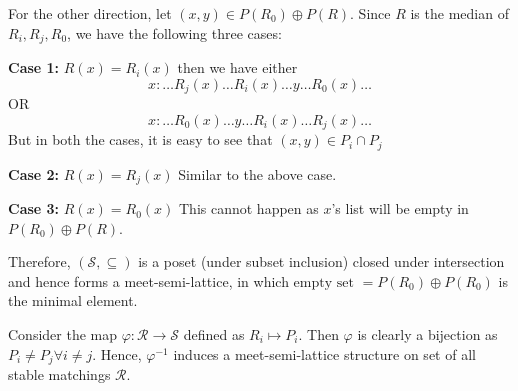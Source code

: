 \documentclass[12pt]{article}
\begin{document}
For the other direction, let $(x,y) \in P(R_0) \oplus P(R)$. Since $R$ is the median of $R_i, R_j, R_0$, we have the following three cases:

\textbf{Case 1:} $R(x) = R_i(x)$ then we have either 
$$x: \ldots R_j(x) \ldots R_i(x) \ldots y \ldots R_0(x) \ldots$$
OR
$$x: \ldots R_0(x) \ldots y \ldots R_i(x) \ldots R_j(x) \ldots$$
But in both the cases, it is easy to see that $(x,y) \in P_i \cap P_j$

\textbf{Case 2:} $R(x) = R_j(x)$ Similar to the above case.

\textbf{Case 3:} $R(x) = R_0(x)$ This cannot happen as $x$'s list will be empty in $P(R_0) \oplus P(R)$.
\newline

Therefore, $(\mathscr{S}, \subseteq)$ is a poset (under subset inclusion) closed under intersection and hence forms a meet-semi-lattice, in which $\text{empty set } = P(R_0) \oplus P(R_0)$ is the minimal element.

Consider the map $\varphi: \mathscr{R} \rightarrow \mathscr{S}$ defined as $R_i \mapsto P_i$. Then $\varphi$ is clearly a bijection as $P_i \neq P_j \forall i \neq j$. Hence, $\varphi^{-1}$ induces a meet-semi-lattice structure on set of all stable matchings $\mathscr{R}$.
\end{document}
